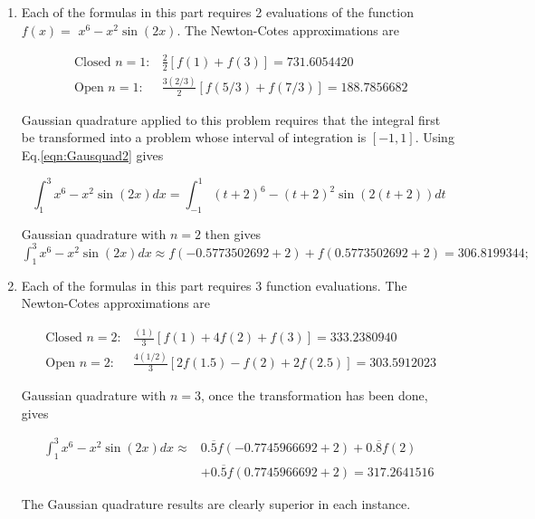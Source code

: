 \begin{mysolution}
\begin{enumerate}[label=(\alph*)]
\item Each of the formulas in this part requires 2 evaluations of the function $f(x)=$ $x^{6}-x^{2} \sin (2 x)$. The Newton-Cotes approximations are

$$
\begin{aligned}
\text { Closed } n=1: & \frac{2}{2}[f(1)+f(3)]=731.6054420 \\
\text { Open } n=1: & \frac{3(2 / 3)}{2}[f(5 / 3)+f(7 / 3)]=188.7856682
\end{aligned}
$$

Gaussian quadrature applied to this problem requires that the integral first be transformed into a problem whose interval of integration is $[-1,1]$. Using Eq.\ref{eqn:Gausquad2} gives

$$
\int_{1}^{3} x^{6}-x^{2} \sin (2 x) d x=\int_{-1}^{1}(t+2)^{6}-(t+2)^{2} \sin (2(t+2)) d t
$$

Gaussian quadrature with $n=2$ then gives\\
$\int_{1}^{3} x^{6}-x^{2} \sin (2 x) d x \approx f(-0.5773502692+2)+f(0.5773502692+2)=306.8199344 ;$\\
\item Each of the formulas in this part requires 3 function evaluations. The Newton-Cotes approximations are

$$
\begin{aligned}
\text { Closed } n=2: & \frac{(1)}{3}[f(1)+4 f(2)+f(3)]=333.2380940 \\
\text { Open } n=2: & \frac{4(1 / 2)}{3}[2 f(1.5)-f(2)+2 f(2.5)]=303.5912023
\end{aligned}
$$

Gaussian quadrature with $n=3$, once the transformation has been done, gives

$$
\begin{aligned}
\int_{1}^{3} x^{6}-x^{2} \sin (2 x) d x \approx & 0 . \overline{5} f(-0.7745966692+2)+0 . \overline{8} f(2) \\
& +0 . \overline{5} f(0.7745966692+2)=317.2641516
\end{aligned}
$$

The Gaussian quadrature results are clearly superior in each instance.
\end{enumerate}
\end{mysolution}
%
